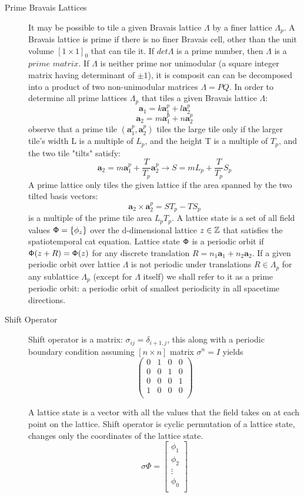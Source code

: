 \begin{description}
\begin{description}
\item[Prime Bravais Lattices]

It may be possible to tile a given Bravais lattice $\Lambda$ by a finer
lattice $\Lambda_p$. A Bravais lattice is prime if there is no finer
Bravais cell, other than the unit volume $[1\times 1]_0$ that can tile
it. If $det \Lambda$ is a prime number, then $\Lambda$ is a
$\textit{prime matrix}$. If $\Lambda$ is neither prime nor unimodular (a
square integer matrix having determinant of $\pm 1$), it is composit can
can be decomposed into a product of two non-unimodular matrices
$\Lambda=PQ$. In order to determine all prime lattices $\Lambda_p$ that
tiles a given Bravais lattice $\Lambda$:
$$\mathbf{a}_1=k\mathbf{a}_1^p+l\mathbf{a}_2^p$$
$$\mathbf{a}_2=m\mathbf{a}_1^p+n\mathbf{a}_2^p$$
observe that a prime tile $(\mathbf{a}_1^p,\mathbf{a}_2^p)$ tiles the large tile only if the larger tile's width L is a multiple of $L_p$, and the height T is a multiple of $T_p$, and the two tile "tilts" satisfy:
$$\mathbf{a}_2=m\mathbf{a}_1^p+\frac{T}{T_p}\mathbf{a}_2^p \to S=mL_p+\frac{T}{T_p}S_p $$
A prime lattice only tiles the given lattice if the area spanned by the two tilted basis vectors:
$$\mathbf{a}_2\times \mathbf{a}_2^p=ST_p-TS_p$$
is a multiple of the prime tile area $L_p T_p$. A lattice state is a set
of all field values $\mathsf{\Phi}=\{\phi_z\}$ over the d-dimensional lattice
$z\in\mathbb{Z}$ that satisfies the spatiotemporal cat equation. Lattice
state $\mathsf{\Phi}$ is a periodic orbit if $\mathsf{\Phi}(z+R)=\mathsf{\Phi}(z)$ for any discrete
translation $R=n_1\mathbf{a}_1+n_2\mathbf{a}_2$. If a given periodic
orbit over lattice $\Lambda$ is not periodic under translations
$R\in\Lambda_p$ for any sublattice $\Lambda_p$ (except for $\Lambda$
itself) we shall refer to it as a prime periodic orbit: a periodic orbit
of smallest periodicity in all spacetime directions.

\item[Shift Operator]

Shift operator is a matrix: $\sigma_{ij}=\delta_{i+1,j}$, this along with a periodic boundary condition assuming $[n\times n]$ matrix $\sigma^n=I$ yields
$$\left( \begin{array}{cccc}
0&1&0&0\\
0&0&1&0\\
0&0&0&1\\
1&0&0&0\\
\end{array}\right)$$

A lattice state is a vector with all the values that the field takes on at each point on the lattice. Shift operator is cyclic permutation of a lattice state, changes only the coordinates of the lattice state.
$$\sigma\Phi=\left[ \begin{array}{c}
\phi_1\\
\phi_2\\
\vdots\\
\phi_0\\
\end{array}
\right]$$


\end{description}
\end{description}
